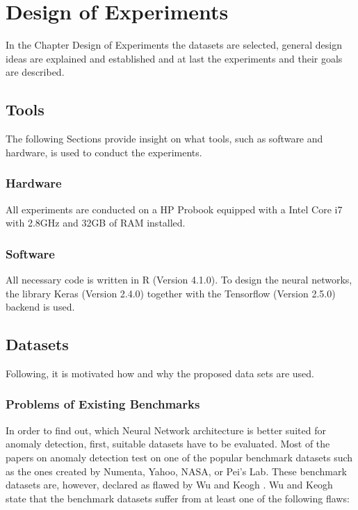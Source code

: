 \chapter{Design of Experiments}
In the Chapter Design of Experiments the datasets are selected, general design ideas are explained and established and at last the experiments and their goals are described.

\section{Tools}
The following Sections provide insight on what tools, such as software and hardware, is used to conduct the experiments.

\subsection{Hardware}
All experiments are conducted on a HP Probook equipped with a Intel Core i7 with 2.8GHz and 32GB of RAM installed.

\subsection{Software}
All necessary code is written in R (Version 4.1.0). To design the neural networks, the library Keras (Version 2.4.0) together with the Tensorflow (Version 2.5.0) backend is used.


\section{Datasets}
Following, it is motivated how and why the proposed data sets are used.

\subsection{Problems of Existing Benchmarks} \label{Problems of Existing Benchmarks}
In order to find out, which Neural Network architecture is better suited for anomaly detection, first, suitable datasets have to be evaluated. Most of the papers on anomaly detection test on one of the popular benchmark datasets such as the ones created by Numenta, Yahoo, NASA, or Pei's Lab. These benchmark datasets are, however, declared as flawed by Wu and Keogh \parencite{YEAR}. Wu and Keogh state that the benchmark datasets suffer from at least one of the following flaws:


